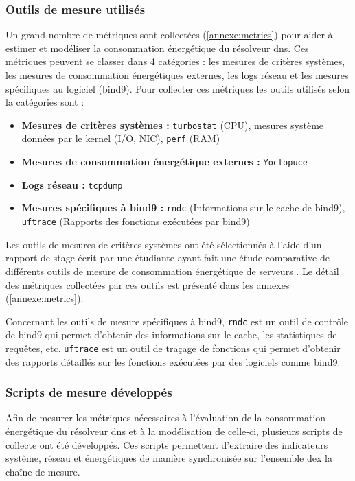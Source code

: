 \documentclass[12pt, a4paper]{report}
\begin{document}
	\subsubsection{Outils de mesure utilisés}
	Un grand nombre de métriques sont collectées (\ref{annexe:metrics}) pour aider à estimer et modéliser la consommation énergétique du résolveur \gls{dns}. Ces métriques peuvent se classer dans 4 catégories : les mesures de critères systèmes, les mesures de consommation énergétiques externes, les logs réseau et les mesures spécifiques au logiciel (\gls{bind9}).
	Pour collecter ces métriques les outils utilisés selon la catégories sont :
	\begin{itemize}
		\item \textbf{Mesures de critères systèmes :} \texttt{turbostat} (CPU), mesures système données par le kernel (I/O, NIC), \texttt{perf} (RAM)
		\item \textbf{Mesures de consommation énergétique externes :} \texttt{Yoctopuce}
		\item \textbf{Logs réseau :} \texttt{tcpdump}
		\item \textbf{Mesures spécifiques à \gls{bind9} :} \texttt{rndc} (Informations sur le cache de \gls{bind9}), \texttt{uftrace} \cite{UFtrace} (Rapports des fonctions exécutées par \gls{bind9})
	\end{itemize}

	Les outils de mesures de critères systèmes ont été sélectionnés à l'aide d'un rapport de stage écrit par une étudiante ayant fait une étude comparative de différents outils de mesure de consommation énergétique de serveurs \cite{EnergyMeasurementTools}. Le détail des métriques collectées par ces outils est présenté dans les annexes (\ref{annexe:metrics}).
	
	Concernant les outils de mesure spécifiques à \gls{bind9}, \texttt{rndc} est un outil de contrôle de \gls{bind9} qui permet d'obtenir des informations sur le cache, les statistiques de requêtes, etc. \texttt{uftrace} est un outil de traçage de fonctions qui permet d'obtenir des rapports détaillés sur les fonctions exécutées par des logiciels comme \gls{bind9}.
	
	\subsubsection{Scripts de mesure développés}

	Afin de mesurer les métriques nécessaires à l'évaluation de la consommation énergétique du résolveur \gls{dns} et à la modélisation de celle-ci, plusieurs scripts de collecte ont été développés. Ces scripts permettent d'extraire des indicateurs système, réseau et énergétiques de manière synchronisée sur l'ensemble dex la chaîne de mesure.
\end{document}
